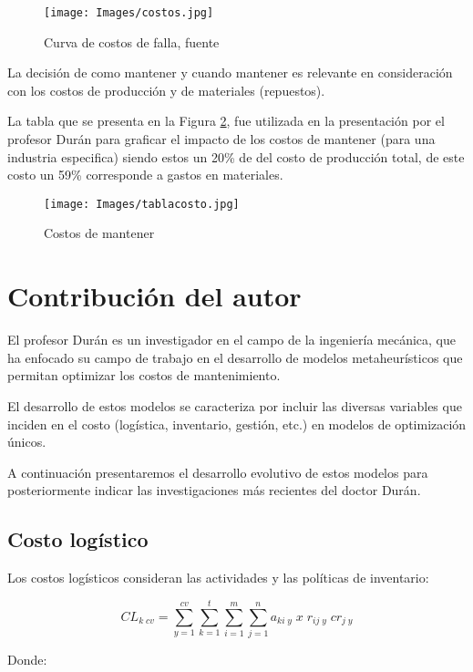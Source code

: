 \documentclass{article}
\begin{document}
\begin{figure}[H]
\texttt{[image: Images/costos.jpg]}
\centering
\caption{Curva de costos de falla, fuente \cite{article1}}
\label{costos}
\end{figure}

La decisión de como mantener y cuando mantener es relevante en consideración con los costos de producción y de materiales (repuestos). 

La tabla que se presenta en la Figura \ref{tabla}, fue utilizada en la presentación por el profesor Durán para graficar el impacto de los costos de mantener (para una industria especifica) siendo estos un 20\% de del costo de producción total, de este costo un 59\% corresponde a gastos en materiales. 

\begin{figure}[H]
\texttt{[image: Images/tablacosto.jpg]}
\centering
\caption{Costos de mantener}
\label{tabla}
\end{figure}

\section{Contribución del autor}

El profesor Durán es un investigador en el campo de la ingeniería mecánica, que ha enfocado su campo de trabajo en el desarrollo de modelos metaheurísticos que permitan optimizar los costos de mantenimiento.

El desarrollo de estos modelos se caracteriza por incluir las diversas variables que inciden en el costo (logística, inventario, gestión, etc.) en modelos de optimización únicos.

A continuación presentaremos el desarrollo evolutivo de estos modelos para posteriormente indicar las investigaciones más recientes del doctor Durán.

\subsection{Costo logístico}

Los costos logísticos consideran las actividades y las políticas de inventario:

\begin{equation}
  CL_{k\;cv}=\sum_{y=1}^{cv} \sum_{k=1}^{t} \sum_{i=1}^{m} \sum_{j=1}^{n} a_{ki\;y}\;x\; r_{ij\;y}\; cr_{j\;y}
  \end{equation}

Donde:
\end{document}
